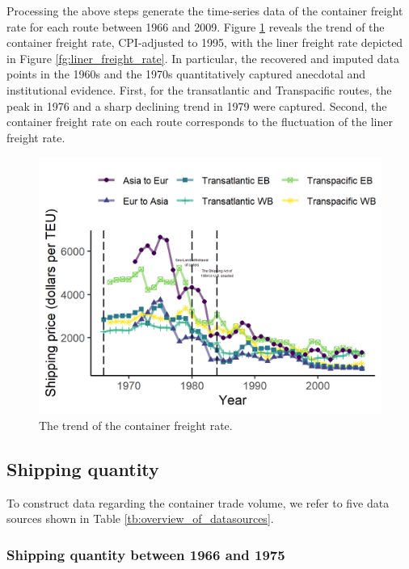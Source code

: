 Processing the above steps generate the time-series data of the container freight rate for each route between 1966 and 2009. Figure \ref{fg:container_freight_rate_each_route} reveals the trend of the container freight rate, CPI-adjusted to 1995, with the liner freight rate depicted in Figure \ref{fg:liner_freight_rate}. In particular, the recovered and imputed data points in the 1960s and the 1970s quantitatively captured anecdotal and institutional evidence. First, for the transatlantic and Transpacific routes, the peak in 1976 and a sharp declining trend in 1979 were captured. Second, the container freight rate on each route corresponds to  the fluctuation of the liner freight rate.

\begin{figure}[!ht]
\begin{center}
\includegraphics[height = 0.5\textheight]{figuretable/container_freight_rate_each_route.png}
\end{center}
\caption{The trend of the container freight rate.}
\label{fg:container_freight_rate_each_route}
\end{figure}

\subsection{Shipping quantity}

To construct data regarding the container trade volume, we refer to five data sources shown in Table \ref{tb:overview_of_datasources}.

\subsubsection{Shipping quantity between 1966 and 1975}

